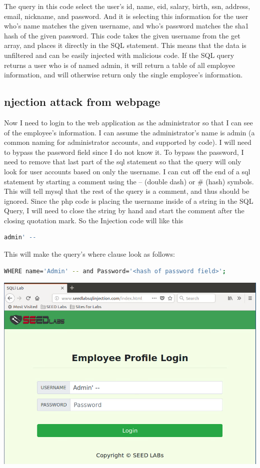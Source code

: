 \documentclass[14pt]{extarticle}
\begin{document}
The query in this code select the user's id, name, eid, salary, birth, ssn, address, email, nickname, and password. And it is selecting this information for the user who's name matches the given username, and who's password matches the sha1 hash of the given password. This code takes the given username from the get array, and places it directly in the SQL statement. This means that the data is unfiltered and can be easily injected with malicious code.  If the SQL query returns a user who is of named admin, it will return a table of all employee information, and will otherwise return only the single employee's information\cite{seed-sqlatk}.


\subsection{njection attack from webpage}
Now I need to login to the web application as the administrator so that I can see of the employee's information. I can assume the administrator's name is admin (a common naming for administrator accounts, and supported by code). I will need to bypass the password field since I do not know it. To bypass the password, I need to remove that last part of the sql statement so that the query will only look for user accounts based on only the username. I can cut off the end of a sql statement by starting a comment using the -- (double dash) or \# (hash) symbols. This will tell mysql that the rest of the query is a comment, and thus should be ignored.
Since the php code is placing the username inside of a string in the SQL Query, I will need to close the string by hand and start the comment after the closing quotation mark. So the Injection code will like this
\begin{lstlisting}[language=sh]
admin' --
\end{lstlisting}
This will make the query's where clause look as follows:
\begin{lstlisting}[language=sh]
WHERE name='Admin' -- and Password='<hash of password field>';
\end{lstlisting}
\begin{center}
\includegraphics[width=\linewidth]{home-page-filled}\\
\end{center}
\end{document}
